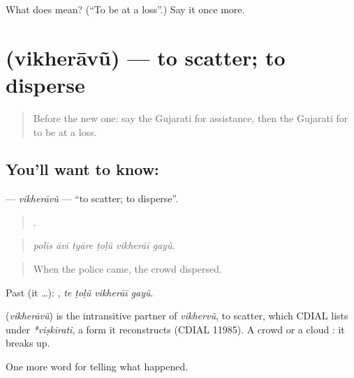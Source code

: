 \begin{tcolorbox}[breakable,colback=teal!4,colframe=teal!35!black,title={Before you move on}]
What does  mean? (\textquotedblleft{}To be at a loss\textquotedblright{}.) Say it once more.
\end{tcolorbox}
\section[\texorpdfstring{\gu{વિખેરાવું} (vikherāvũ)}{વિખેરાવું (vikherāvũ)}]{ (vikherāvũ) — to scatter; to disperse}

\label{lesson:GU-C310-vikheravu}



\begin{quote}
Before the new one: say the Gujarati for assistance, then the Gujarati for to be at a loss.
\end{quote}

\subsection*{You'll want to know: }
\textbf{} — \emph{vikherāvũ} — \textquotedblleft{}to scatter; to disperse\textquotedblright{}.

\begin{quote}
     .
\end{quote}

\begin{quote}
\emph{polīs āvī tyāre ṭoḷũ vikherāī gayũ.}
\end{quote}

\begin{quote}
When the police came, the crowd dispersed.
\end{quote}

Past (it …):    , \emph{te ṭoḷũ vikherāī gayũ}.

\begin{cousinweb}
\textbf{} (\emph{vikherāvũ}) is the intransitive partner of \emph{vikhervũ}, to scatter, which CDIAL lists under \emph{*viṣkirati}, a form it reconstructs (CDIAL 11985). A crowd or a cloud \textbf{  }: it breaks up.
\end{cousinweb}

\begin{grammarlens}[title={What you've built}]
One more word for telling what happened.
\end{grammarlens}

